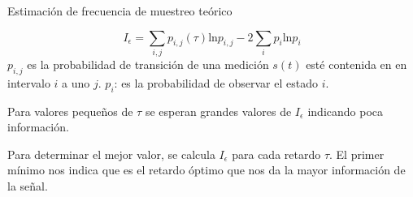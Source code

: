 \documentclass{beamer}
\theoremstyle{definition}
\begin{document}
\begin{frame}{Estimación de frecuencia de muestreo teórico}


$$
I_\epsilon = \sum_{i,j} p_{i,j}(\tau)\text{ln}p_{i,j}-2\sum_i {p_i}\text{ln}p_i
$$
$p_{i,j}$ es la probabilidad de transición de una medición $s(t)$ esté contenida en en intervalo $i$ a uno $j$.
$p_i$: es la probabilidad de observar el estado $i$.

Para valores pequeños de $\tau$ se esperan grandes valores de  $I_\epsilon$ indicando poca información. 

Para determinar el mejor valor, se calcula $I_\epsilon$ para  cada retardo $\tau$. El primer mínimo nos indica que es el retardo óptimo que nos da la mayor información de la señal.

 

\end{frame}
\end{document}
